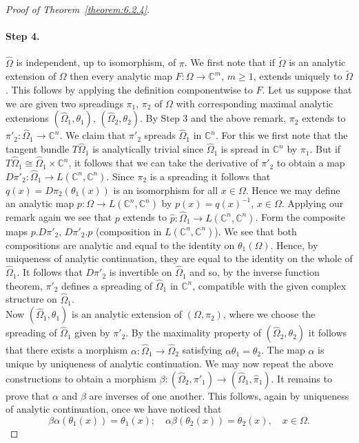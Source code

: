 \begin{proof}[Proof of Theorem~\ref{theorem:6.2.4}]
\paragraph{Step 4.} $\widehat\Omega$ is independent, up to isomorphism, of $\pi$. We first note that if $\widetilde\Omega$ is an analytic extension of $\Omega$ then every analytic map $F:\Omega\to\mathbb C^m$, $m\geq1$, extends uniquely to $\widetilde\Omega$. This follows by applying the definition componentwise to $F$.
Let us suppose that we are given two spreadings $\pi_1$, $\pi_2$ of $\Omega$ with corresponding maximal analytic extensions $(\widehat\Omega_1,\theta_1)$, $(\widehat\Omega_2,\theta_2)$. By Step 3 and the above remark, $\pi_2$ extends to $\pi'_2:\widehat\Omega_1\to\mathbb C^n$. We claim that $\pi'_2$ spreads $\widehat\Omega_1$ in $\mathbb C^n$. For this we first note that the tangent bundle $T\widehat\Omega_1$ is analytically trivial since $\widehat\Omega_1$ is spread in $\mathbb C^n$ by $\pi_1$. But if $T\widehat\Omega_1\cong\widehat\Omega_1\times\mathbb C^n$, it follows that we can take the derivative of $\pi'_2$ to obtain a map $D\pi'_2:\widehat\Omega_1\to L(\mathbb C^n,\mathbb C^n)$. Since $\pi_2$ is a spreading it follows that $q(x)=D\pi_2(\theta_1(x))$ is an isomorphism for all $x\in\Omega$. Hence we may define an analytic map $p:\Omega\to L(\mathbb C^n,\mathbb C^n)$ by $p(x)=q(x)^{-1}$, $x\in\Omega$. Applying our remark again we see that $p$ extends to $\widehat p:\widehat\Omega_1\to L(\mathbb C^n,\mathbb C^n)$. Form the composite maps $p.D\pi'_2$, $D\pi'_2.p$ (composition in $L(\mathbb C^n,\mathbb C^n)$). We see that both compositions are analytic and equal to the identity on $\theta_1(\Omega)$. Hence, by uniqueness of analytic continuation, they are equal to the identity on the whole of $\widehat\Omega_1$. It follows that $D\pi'_2$ is invertible on $\widehat\Omega_1$ and so, by the inverse function theorem, $\pi'_2$ defines a spreading of $\widehat\Omega_1$ in $\mathbb C^n$, compatible with the given complex structure on $\widehat\Omega_1$.
\[

\]
Now $(\widehat\Omega_1,\theta_1)$ is an analytic extension of $(\Omega,\pi_2)$, where we choose the spreading of $\widehat\Omega_1$ given by $\pi'_2$. By the maximality property of $(\widehat\Omega_2,\theta_2)$ it follows that there exists a morphism $\alpha:\widehat\Omega_1\to\widehat\Omega_2$ satisfying $\alpha\theta_1=\theta_2$. The map $\alpha$ is unique by uniqueness of analytic continuation. We may now repeat the above constructions to obtain a morphism $\beta:(\widehat\Omega_2,\pi'_1)\to(\widehat\Omega_1,\widehat\pi_1)$. It remains to prove that $\alpha$ and $\beta$ are inverses of one another. This follows, again by uniqueness of analytic continuation, once we have noticed that
\[
\beta\alpha(\theta_1(x))=\theta_1(x);\quad\alpha\beta(\theta_2(x))=\theta_2(x),\quad x\in\Omega.
\]
\end{proof}
